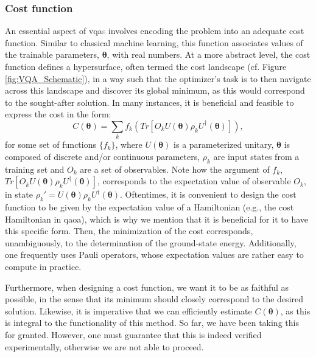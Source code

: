 \subsubsection*{\small Cost function}
An essential aspect of \acrshort{vqa}\textcolor{gray}{s} involves encoding the problem into an adequate cost function. Similar to classical machine learning, this function associates values of the trainable parameters, $\boldsymbol{\theta}$, with real numbers. At a more abstract level, the cost function defines a hypersurface, often termed the cost landscape (cf. Figure \ref{fig:VQA_Schematic}), in a way such that the optimizer's task is to then navigate across this landscape and discover its global minimum, as this would correspond to the sought-after solution. In many instances, it is beneficial and feasible to express the cost in the form:
\begin{equation}\label{eq:Cost}
    C(\boldsymbol{\theta}) = \sum_k f_k\left( Tr\left[O_k U(\boldsymbol{\theta}) \rho_k U^{\dagger}(\boldsymbol{\theta})\right] \right),
\end{equation}
for some set of functions $\{f_k\}$, where $U(\boldsymbol{\theta})$ is a parameterized unitary, $\boldsymbol{\theta}$ is composed of discrete and/or continuous parameters, $\rho_k$ are input states from a training set and $O_k$ are a set of observables. Note how the argument of $f_k$, $Tr\left[O_k U(\boldsymbol{\theta}) \rho_k U^{\dagger}(\boldsymbol{\theta})\right]$, corresponds to the expectation value of observable $O_k$, in state $\rho_k' = U(\boldsymbol{\theta}) \rho_k U^{\dagger}(\boldsymbol{\theta})$. Oftentimes, it is convenient to design the cost function to be given by the expectation value of a Hamiltonian (e.g., the cost Hamiltonian in \acrshort{qaoa}), which is why we mention that it is beneficial for it to have this specific form. Then, the minimization of the cost corresponds, unambiguously, to the determination of the ground-state energy. Additionally, one frequently uses Pauli operators, whose expectation values are rather easy to compute in practice.

Furthermore, when designing a cost function, we want it to be as faithful as possible, in the sense that its minimum should closely correspond to the desired solution. Likewise, it is imperative that we can efficiently estimate $C(\boldsymbol{\theta})$, as this is integral to the functionality of this method. So far, we have been taking this for granted. However, one must guarantee that this is indeed verified experimentally, otherwise we are not able to proceed.

